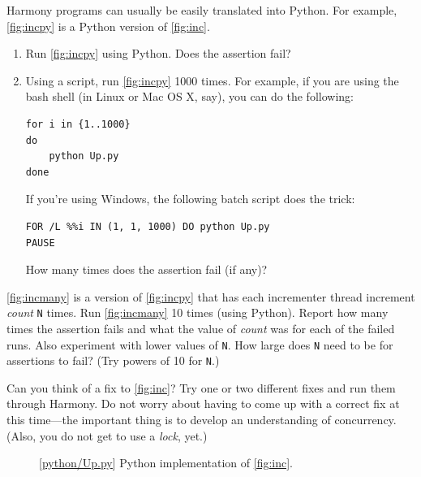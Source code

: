 \documentclass{report}
\newcommand{\harmonylink}[1]{%
[\href{https://harmony.cs.cornell.edu/#1}{\underline{#1}}]%
}
\newenvironment{code}{
\tcolorbox
}{
\endtcolorbox
}
\begin{document}
\begin{problems}
\item Harmony programs can usually be easily translated into Python.  For example,
\autoref{fig:incpy} is a Python version of \autoref{fig:inc}.
\begin{enumerate}
\item Run \autoref{fig:incpy} using Python.  Does the assertion fail?
\item Using a script, run \autoref{fig:incpy} 1000 times.
For example, if you are using the bash shell (in Linux or Mac OS X, say), you can do the following:
\begin{code}
\begin{verbatim}
for i in {1..1000}
do
    python Up.py
done
\end{verbatim}
\end{code}
If you're using Windows, the following batch script does the trick:
\begin{code}
\begin{verbatim}
FOR /L %%i IN (1, 1, 1000) DO python Up.py
PAUSE
\end{verbatim}
\end{code}
How many times does the assertion fail (if any)?
\end{enumerate}
\item \autoref{fig:incmany} is a version of \autoref{fig:incpy} that has each
incrementer thread increment \textit{count} \texttt{N} times.  Run \autoref{fig:incmany}
10 times (using Python).
Report how many times the assertion fails and what the value of \textit{count}
was for each of the failed runs.
Also experiment with lower values of \texttt{N}.
How large does \texttt{N} need to be for assertions to fail?
(Try powers of 10 for \texttt{N}.)
\item Can you think of a fix to \autoref{fig:inc}?  Try one or two different fixes
and run them through Harmony.  Do not worry about having to come up with a correct fix at this
time---the important thing is to develop an understanding of concurrency.
(Also, you do not get to use a \emph{lock}, yet.)
\end{problems}

\begin{figure}
\begin{code}
\end{code}
\caption{\harmonylink{python/Up.py} Python implementation of \autoref{fig:inc}.}
\label{fig:incpy}
\end{figure}
\end{document}
